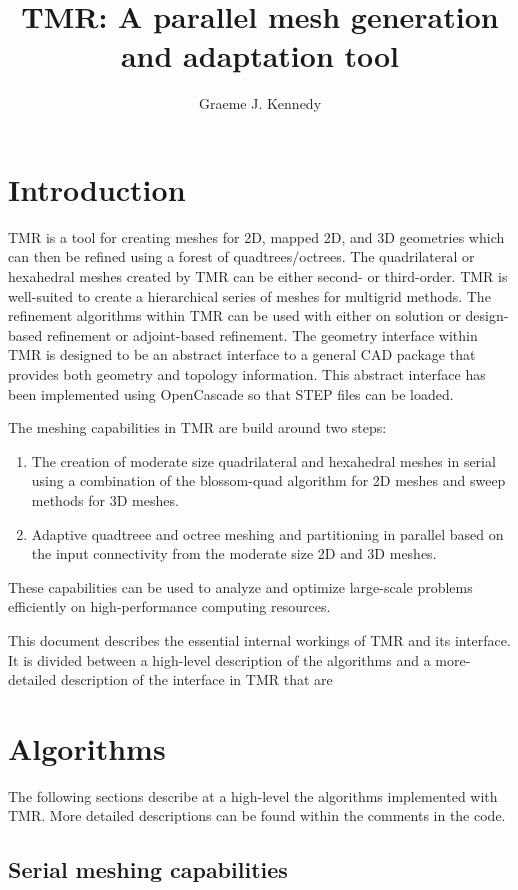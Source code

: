 \documentclass[12pt]{article}
\title{TMR: A parallel mesh generation and adaptation tool}
\author{Graeme J. Kennedy}
\date{}
\begin{document}
\maketitle

\section{Introduction}

TMR is a tool for creating meshes for 2D, mapped 2D, and 3D geometries which can then be refined using a forest of quadtrees/octrees.
The quadrilateral or hexahedral meshes created by TMR can be either second- or third-order.
TMR is well-suited to create a hierarchical series of meshes for multigrid methods.
The refinement algorithms within TMR can be used with either on solution or design-based refinement or adjoint-based refinement.
The geometry interface within TMR is designed to be an abstract interface to a general CAD package that provides both geometry and topology information.
This abstract interface has been implemented using OpenCascade so that STEP files can be loaded.

The meshing capabilities in TMR are build around two steps:
%
\begin{enumerate}
  \item The creation of moderate size quadrilateral and hexahedral meshes in serial using a combination of the blossom-quad algorithm for 2D meshes and sweep methods for 3D meshes.
  \item Adaptive quadtreee and octree meshing and partitioning in parallel based on the input connectivity from the moderate size 2D and 3D meshes.
\end{enumerate}
%
These capabilities can be used to analyze and optimize large-scale problems efficiently on high-performance computing resources. 

This document describes the essential internal workings of TMR and its interface.
It is divided between a high-level description of the algorithms and a more-detailed description of the interface in TMR that are

\section{Algorithms}

The following sections describe at a high-level the algorithms implemented with TMR.
More detailed descriptions can be found within the comments in the code.

\subsection{Serial meshing capabilities}
\end{document}
